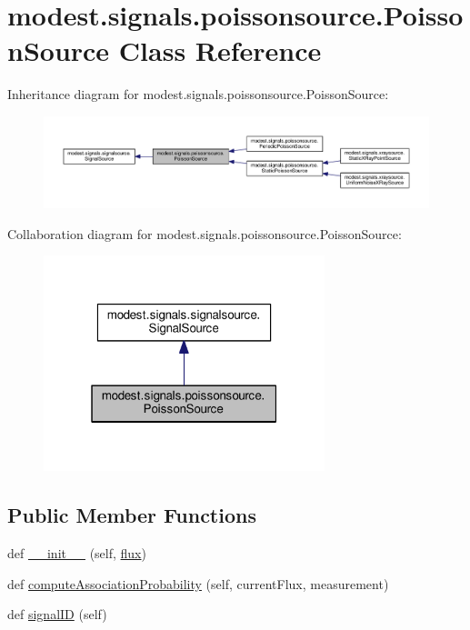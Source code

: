 \hypertarget{classmodest_1_1signals_1_1poissonsource_1_1PoissonSource}{}\section{modest.\+signals.\+poissonsource.\+Poisson\+Source Class Reference}
\label{classmodest_1_1signals_1_1poissonsource_1_1PoissonSource}


Inheritance diagram for modest.\+signals.\+poissonsource.\+Poisson\+Source\+:\nopagebreak
\begin{figure}[H]
\begin{center}
\leavevmode
\includegraphics[width=350pt]{classmodest_1_1signals_1_1poissonsource_1_1PoissonSource__inherit__graph}
\end{center}
\end{figure}


Collaboration diagram for modest.\+signals.\+poissonsource.\+Poisson\+Source\+:\nopagebreak
\begin{figure}[H]
\begin{center}
\leavevmode
\includegraphics[width=232pt]{classmodest_1_1signals_1_1poissonsource_1_1PoissonSource__coll__graph}
\end{center}
\end{figure}
\subsection*{Public Member Functions}
\begin{DoxyCompactItemize}
\item 
def \hyperlink{classmodest_1_1signals_1_1poissonsource_1_1PoissonSource_a99a01c192bed30cb9f8a08d1a1ee8706}{\+\_\+\+\_\+init\+\_\+\+\_\+} (self, \hyperlink{classmodest_1_1signals_1_1poissonsource_1_1PoissonSource_a6f2c657ad936b921715d826ac74f7fe5}{flux})
\item 
def \hyperlink{classmodest_1_1signals_1_1poissonsource_1_1PoissonSource_a2f8a73e6f51cbdcd0f1e646d6f4d4574}{compute\+Association\+Probability} (self, current\+Flux, measurement)
\item 
def \hyperlink{classmodest_1_1signals_1_1signalsource_1_1SignalSource_a9a64c6a9c2954f6ad61e4ca3518ea8ab}{signal\+ID} (self)
\end{DoxyCompactItemize}
